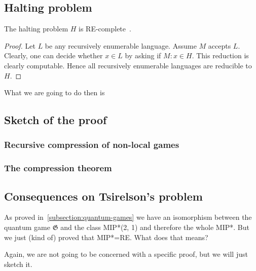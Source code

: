 
\subsection{Halting problem}

\begin{theorem}
    The halting problem $H$ is RE-complete~\cite{Algorithms}.
\begin{proof}
    Let $L$ be any recursively enumerable language. Assume $M$ accepts $L$. Clearly, one can decide whether $x \in L$ by asking if $M: x \in H$. This reduction is clearly computable. Hence all recursively enumerable languages are reducible to $H$.
\end{proof}
\end{theorem}

What we are going to do then is 
\subsection{Sketch of the proof}
\subsubsection{Recursive compression of non-local games}
\subsubsection{The compression theorem}

\subsection{Consequences on Tsirelson's problem}
As proved in~\ref{subsection:quantum-games} we have an isomorphism between the quantum game $\mathfrak{G}$ and the class MIP*(2, 1) and therefore the whole MIP*. But we just (kind of) proved that MIP*=RE.
What does that means?

Again, we are not going to be concerned with a specific proof, but we will just sketch it.


